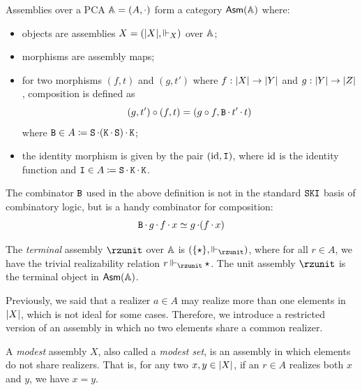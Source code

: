 \begin{definition}
    Assemblies over a PCA \(\mathbb{A} = (A, \mathop\cdot\nolimits)\) form a category \(\mathsf{Asm}(\mathbb{A})\) where:
    \begin{itemize}
        \item objects are assemblies \(X = (\vert X \vert, \mathbin\Vdash_{X})\) over \(\mathbb{A}\);
        \item morphisms are assembly maps;
        \item for two morphisms \((f, t)\) and \((g, t')\) where \(f : \vert X \vert \rightarrow \vert Y \vert\) and \(g : \vert Y \vert \rightarrow \vert Z \vert\), composition is defined as
        \[
            (g, t') \circ (f, t) = (g \circ f, \mathtt{B} \mathop\cdot\nolimits t' \mathop\cdot\nolimits t)
        \]
        where \(\mathtt{B} \in A \coloneq \mathtt{S} \mathop\cdot\nolimits (\mathtt{K} \mathop\cdot\nolimits \mathtt{S}) \mathop\cdot\nolimits \mathtt{K}\);
        \item the identity morphism is given by the pair \((\operatorname{id}, \mathtt{I})\), where \(\operatorname{id}\) is the identity function and \(\mathtt{I} \in A \coloneq \mathtt{S} \mathop\cdot\nolimits \mathtt{K} \mathop\cdot\nolimits \mathtt{K}\).
    \end{itemize}
\end{definition}

The combinator \(\mathtt{B}\) used in the above definition is not in the standard \(\mathtt{S}\mathtt{K}\mathtt{I}\) basis of combinatory logic, but is a handy combinator for composition:
\[
    \mathtt{B} \mathop\cdot\nolimits g \mathop\cdot\nolimits f \mathop\cdot\nolimits x \simeq g \mathop\cdot\nolimits (f \mathop\cdot\nolimits x)
\]

\begin{example}
    The \emph{terminal} assembly \(\rzunit\) over \(\mathbb{A}\) is \((\{\star\}, \rzrz_{\rzunit})\), where for all \(r \in A\), we have the trivial realizability relation \(r \rzrz_{\rzunit} \star\).  The unit assembly \(\rzunit\) is the terminal object in \(\mathsf{Asm}(\mathbb{A})\).
\end{example}

Previously, we said that a realizer \(a \in A\) may realize more than one elements in \(\vert X \vert\), which is not ideal for some cases.  Therefore, we introduce a restricted version of an assembly in which no two elements share a common realizer.

\begin{definition}
    A \emph{modest} assembly \(X\), also called a \emph{modest set}, is an assembly in which elements do not share realizers.  That is, for any two \(x, y \in \vert X \vert\), if an \(r \in A\) realizes both \(x\) and \(y\), we have \(x = y\).
\end{definition}

